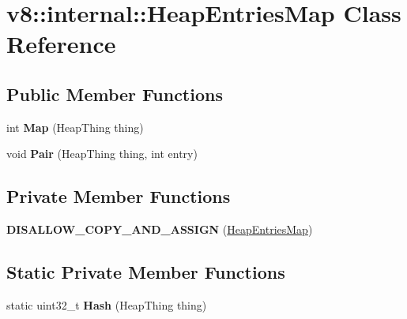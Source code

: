 \hypertarget{classv8_1_1internal_1_1_heap_entries_map}{}\section{v8\+:\+:internal\+:\+:Heap\+Entries\+Map Class Reference}
\label{classv8_1_1internal_1_1_heap_entries_map}
\subsection*{Public Member Functions}
\begin{DoxyCompactItemize}
\item 
int {\bfseries Map} (Heap\+Thing thing)\hypertarget{classv8_1_1internal_1_1_heap_entries_map_a8f21b0b962e46faf2ee21f2faff269fb}{}\label{classv8_1_1internal_1_1_heap_entries_map_a8f21b0b962e46faf2ee21f2faff269fb}

\item 
void {\bfseries Pair} (Heap\+Thing thing, int entry)\hypertarget{classv8_1_1internal_1_1_heap_entries_map_a42f2dcdfaab17a8e5ce6358cdde4b856}{}\label{classv8_1_1internal_1_1_heap_entries_map_a42f2dcdfaab17a8e5ce6358cdde4b856}

\end{DoxyCompactItemize}
\subsection*{Private Member Functions}
\begin{DoxyCompactItemize}
\item 
{\bfseries D\+I\+S\+A\+L\+L\+O\+W\+\_\+\+C\+O\+P\+Y\+\_\+\+A\+N\+D\+\_\+\+A\+S\+S\+I\+GN} (\hyperlink{classv8_1_1internal_1_1_heap_entries_map}{Heap\+Entries\+Map})\hypertarget{classv8_1_1internal_1_1_heap_entries_map_a9b32f44d9fd64f65a2de0e049d524631}{}\label{classv8_1_1internal_1_1_heap_entries_map_a9b32f44d9fd64f65a2de0e049d524631}

\end{DoxyCompactItemize}
\subsection*{Static Private Member Functions}
\begin{DoxyCompactItemize}
\item 
static uint32\+\_\+t {\bfseries Hash} (Heap\+Thing thing)\hypertarget{classv8_1_1internal_1_1_heap_entries_map_a578335168f34e0995f4a0918fcd1d62d}{}\label{classv8_1_1internal_1_1_heap_entries_map_a578335168f34e0995f4a0918fcd1d62d}

\end{DoxyCompactItemize}
